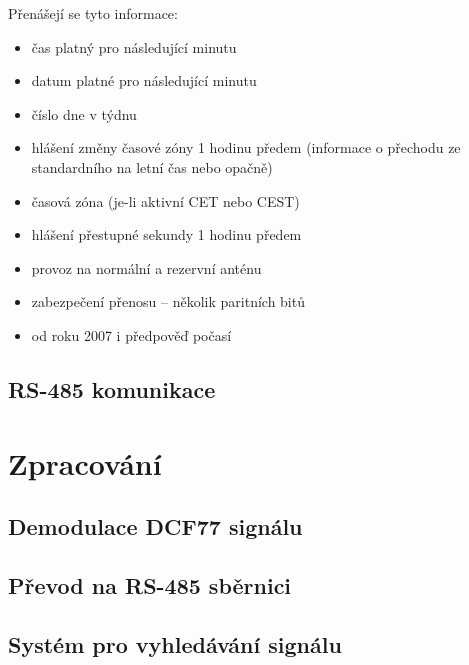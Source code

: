     Přenášejí se tyto informace:

    \begin{itemize}
        \item čas platný pro následující minutu
        \item datum platné pro následující minutu
        \item číslo dne v týdnu
        \item hlášení změny časové zóny 1 hodinu předem (informace o přechodu ze standardního na letní čas nebo opačně)
        \item časová zóna (je-li aktivní CET nebo CEST)
        \item hlášení přestupné sekundy 1 hodinu předem
        \item provoz na normální a rezervní anténu
        \item zabezpečení přenosu – několik paritních bitů
        \item od roku 2007 i předpověď počasí
    \end{itemize}
\subsection{RS-485 komunikace}
\section{Zpracování}
\subsection{Demodulace DCF77 signálu}
\subsection{Převod na RS-485 sběrnici}
\subsection{Systém pro vyhledávání signálu}
